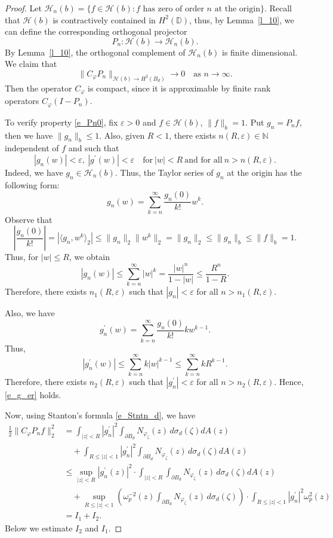 \documentclass{amsart}
\numberwithin{equation}{section}
\theoremstyle{definition}
\newcommand{\bd}{{B_d}}
\newcommand{\meal}{\sigma_d}
\newcommand{\dbr}{\mathcal{H}}
\newcommand{\er}{\varepsilon}
\newcommand{\za}{\zeta}
\newcommand{\ph}{\varphi}
\newcommand{\cph}{C_\varphi}
\newcommand{\om}{\omega}
\newcommand{\Dbb}{\mathbb D}
\newcommand{\Nbb}{\mathbb N}
\newcommand{\spd}{\partial B_d}
\begin{document}
\begin{proof}
Let $\dbr_n (b) = \{f\in\dbr(b): f
\textrm{\ has zero of order $n$ at the origin}  \}$.
Recall that $\dbr(b)$ is contractively contained in $H^2(\Dbb)$, thus,
by Lemma~\ref{l_10}, we can define the corresponding orthogonal projector
\[
P_n: \dbr(b) \to \dbr_n(b).
\]
By Lemma~\ref{l_10}, the orthogonal complement of $\dbr_n(b)$ is finite dimensional.
We claim that
\begin{equation}\label{e_Pn0}
\|\cph P_n\|_{\dbr(b) \to H^2(\bd)} \to 0\quad\textrm{as\ } n\to \infty.
\end{equation}
Then the operator $\cph$ is compact, since it is approximable
by finite rank operators $\cph (I-P_n)$.

To verify property \eqref{e_Pn0}, fix $\er>0$ and $f\in \dbr(b)$, $\|f\|_{b} = 1$.
Put $g_n = P_n f$, then we have $\|g_n\|_{b} \le 1$.
Also, given $R<1$, there exists $n(R, \er)\in\Nbb$ independent of $f$ and such that
\begin{equation}\label{e_g_er}
|g_n(w)| < \er,\ |g^\prime(w)|< \er\quad \textrm{for}\ |w|<R\
\textrm{and for all}\ n>n(R, \er).
\end{equation}
Indeed, we have $g_n \in \dbr_n(b)$.
Thus, the Taylor series of $g_n$ at the origin has the following form:
\[
g_n(w) = \sum_{k=n}^\infty \frac{g_n(0)}{k!} w^k.
\]
Observe that
\[
\left| \frac{g_n(0)}{k!}\right| = |\langle g_n, w^k \rangle_2|
\le \|g_n\|_2 \|w^k\|_2 = \|g_n\|_2 \le \|g_n\|_b \le \|f\|_b =1.
\]
Thus, for $|w|\le R$, we obtain
\[
|g_n(w)| \le \sum_{k=n}^\infty |w|^k = \frac{|w|^n}{1-|w|} \le \frac{R^n}{1-R}.
\]
Therefore, there exists $n_1(R, \er)$ such that $|g_n| < \er$
for all $n > n_1(R, \er)$.

Also, we have
\[
g_n^\prime (w) = \sum_{k=n}^\infty \frac{g_n(0)}{k!} k w^{k-1}.
\]
Thus,
\[
|g_n^\prime (w)| \le \sum_{k=n}^\infty k |w|^{k-1} \le \sum_{k=n}^\infty k R^{k-1}.
\]
Therefore, there exists $n_2(R, \er)$ such that $|g_n^\prime| < \er$
for all $n > n_2(R, \er)$.
Hence, \eqref{e_g_er} holds.


Now, using Stanton's formula \eqref{e_Stntn_d}, we have
\[
\begin{split}
   \frac{1}{2} \|\cph P_n f \|_2^2 &= \int_{|z|<R} |g_n^\prime|^2 \int_{\spd} N_{\ph_\za}(z)\, d\meal(\za) dA(z)\\
     &\quad + \int_{R\le |z|< 1} |g_n^\prime|^2 \int_{\spd} N_{\ph_\za}(z)\, d\meal(\za) dA(z)\\
     &\le \sup_{|z|<R} |g_n^\prime(z)|^2  \cdot \int_{|z|<R}  \int_{\spd} N_{\ph_\za}(z)\, d\meal(\za) dA(z)\\
     &\quad + \sup_{R\le |z|< 1} \left( \om_p^{-2}(z) \int_{\spd} N_{\ph_\za}(z)\, d\meal(\za) \right) 
      \cdot \int_{R\le |z|< 1} |g_n^\prime|^2 \om_p^2(z)\\
     &= I_1 + I_2.
\end{split}
\]
Below we estimate $I_2$ and $I_1$.


\end{proof}
\end{document}

